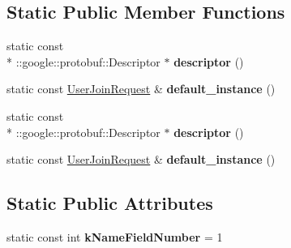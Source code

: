 \subsection*{Static Public Member Functions}
\begin{DoxyCompactItemize}
\item 
\hypertarget{classSimpleChat_1_1UserJoinRequest_a65cc9e081cd5f18c4e4c05949dd62108}{static const \\*
\-::google\-::protobuf\-::\-Descriptor $\ast$ {\bfseries descriptor} ()}\label{classSimpleChat_1_1UserJoinRequest_a65cc9e081cd5f18c4e4c05949dd62108}

\item 
\hypertarget{classSimpleChat_1_1UserJoinRequest_a7ec1f3e172f0e34068ca8772024ace92}{static const \hyperlink{classSimpleChat_1_1UserJoinRequest}{User\-Join\-Request} \& {\bfseries default\-\_\-instance} ()}\label{classSimpleChat_1_1UserJoinRequest_a7ec1f3e172f0e34068ca8772024ace92}

\item 
\hypertarget{classSimpleChat_1_1UserJoinRequest_a65cc9e081cd5f18c4e4c05949dd62108}{static const \\*
\-::google\-::protobuf\-::\-Descriptor $\ast$ {\bfseries descriptor} ()}\label{classSimpleChat_1_1UserJoinRequest_a65cc9e081cd5f18c4e4c05949dd62108}

\item 
\hypertarget{classSimpleChat_1_1UserJoinRequest_a7ec1f3e172f0e34068ca8772024ace92}{static const \hyperlink{classSimpleChat_1_1UserJoinRequest}{User\-Join\-Request} \& {\bfseries default\-\_\-instance} ()}\label{classSimpleChat_1_1UserJoinRequest_a7ec1f3e172f0e34068ca8772024ace92}

\end{DoxyCompactItemize}
\subsection*{Static Public Attributes}
\begin{DoxyCompactItemize}
\item 
\hypertarget{classSimpleChat_1_1UserJoinRequest_a033d146fbe3faeb8bb7f8583c372082e}{static const int {\bfseries k\-Name\-Field\-Number} = 1}\label{classSimpleChat_1_1UserJoinRequest_a033d146fbe3faeb8bb7f8583c372082e}

\end{DoxyCompactItemize}
